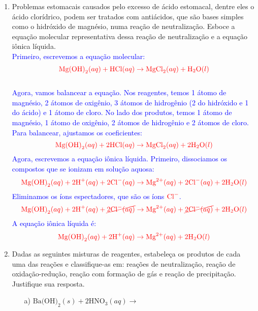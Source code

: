 \documentclass[a4paper, 12pt]{article}
\begin{document}
\begin{enumerate}
    \item Problemas estomacais causados pelo excesso de ácido estomacal, dentre
          eles o ácido clorídrico, podem ser tratados com antiácidos, que são bases
          simples como o hidróxido de magnésio, numa reação de neutralização. Esboce
          a equação molecular representativa dessa reação de neutralização e a
          equação iônica líquida.
          \\[10pt]
          \textcolor{blue}{Primeiro, escrevemos a equação molecular:}
          \[
              \textcolor{red}{\text{Mg(OH)}_2 (aq) + \text{HCl} (aq) \rightarrow \text{MgCl}_2 (aq) + \text{H}_2\text{O} (l)}
          \]
          \\[10pt]
          \textcolor{blue}{Agora, vamos balancear a equação. Nos reagentes, temos 1 átomo de magnésio, 2 átomos de oxigênio, 3 átomos de hidrogênio (2 do hidróxido e 1 do ácido) e 1 átomo de cloro. No lado dos produtos, temos 1 átomo de magnésio, 1 átomo de oxigênio, 2 átomos de hidrogênio e 2 átomos de cloro. Para balancear, ajustamos os coeficientes:}
          \[
              \textcolor{red}{\text{Mg(OH)}_2 (aq) + 2\text{HCl} (aq) \rightarrow \text{MgCl}_2 (aq) + 2\text{H}_2\text{O} (l)}
          \]
          \textcolor{blue}{Agora, escrevemos a equação iônica líquida. Primeiro, dissociamos os compostos que se ionizam em solução aquosa:}
          \[
              \textcolor{red}{\text{Mg(OH)}_2 (aq) + 2\text{H}^+ (aq) + 2\text{Cl}^- (aq) \rightarrow \text{Mg}^{2+} (aq) + 2\text{Cl}^- (aq) + 2\text{H}_2\text{O} (l)}
          \]
          \textcolor{blue}{Eliminamos os íons espectadores, que são os íons \(\textcolor{red}{\text{Cl}^-}\).}
          \[
              \textcolor{red}{\text{Mg(OH)}_2 (aq) + 2\text{H}^+ (aq) + \cancel{2\text{Cl}^- (aq)} \rightarrow \text{Mg}^{2+} (aq) + \cancel{2\text{Cl}^- (aq)} + 2\text{H}_2\text{O} (l)}
          \]
          \textcolor{blue}{A equação iônica líquida é:}
          \[
              \textcolor{red}{\text{Mg(OH)}_2 (aq) + 2\text{H}^+ (aq) \rightarrow \text{Mg}^{2+} (aq) + 2\text{H}_2\text{O} (l)}
          \]



    \item Dadas as seguintes misturas de reagentes, estabeleça os produtos de
          cada uma das reações e classifique-as em: reações de neutralização, reação
          de oxidação-redução, reação com formação de gás e reação de precipitação.
          Justifique sua resposta.
          \begin{enumerate}[align=left, labelsep=-0.5em]
              \item[a)] $\text{Ba(OH)}_{2}(s) + 2\text{HNO}_{3}(aq) \rightarrow$


\end{enumerate}
\end{enumerate}
\end{document}
